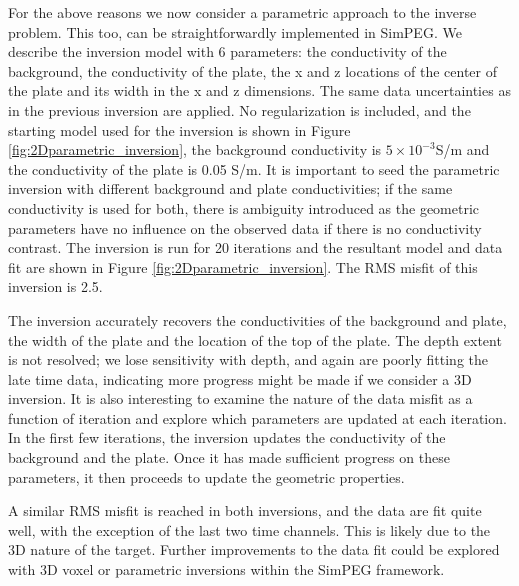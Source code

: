 \documentclass[paper]{geophysics}
\begin{document}
For the above reasons we now consider a parametric approach to the inverse problem. This too, can be straightforwardly implemented in SimPEG. We describe the inversion model with 6 parameters: the conductivity of the background, the conductivity of the plate, the x and z locations of the center of the plate and its width in the x and z dimensions. The same data uncertainties as in the previous inversion are applied. No regularization is included, and the starting model used for the inversion is shown in Figure \ref{fig:2Dparametric_inversion}, the background conductivity is $5\times10^{-3}$S/m and the conductivity of the plate is 0.05 S/m. It is important to seed the parametric inversion with different background and plate conductivities; if the same conductivity is used for both, there is ambiguity introduced as the geometric parameters have no influence on the observed data if there is no conductivity contrast. The inversion is run for 20 iterations and the resultant model and data fit are shown in Figure \ref{fig:2Dparametric_inversion}. The RMS misfit of this inversion is 2.5.

The inversion accurately recovers the conductivities of the background and plate, the width of the plate and the location of the top of the plate. The depth extent is not resolved; we lose sensitivity with depth, and again are poorly fitting the late time data, indicating more progress might be made if we consider a 3D inversion. It is also interesting to examine the nature of the data misfit as a function of iteration and explore which parameters are updated at each iteration. In the first few iterations, the inversion updates the conductivity of the background and the plate. Once it has made sufficient progress on these parameters, it then proceeds to update the geometric properties.

A similar RMS misfit is reached in both inversions, and the data are fit quite well, with the exception of the last two time channels. This is likely due to the 3D nature of the target. Further improvements to the data fit could be explored with 3D voxel or parametric inversions within the SimPEG framework.
\end{document}
